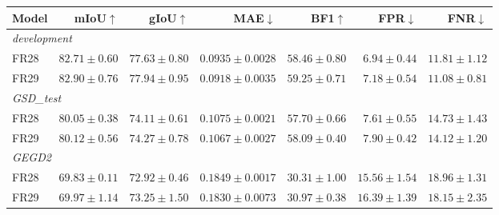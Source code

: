 \par\medskip\noindent\begin{minipage}{\linewidth}
\centering\footnotesize\setlength{\tabcolsep}{3pt}
\label{tab:seeds}
\begin{tabular}{lrrrrrr}
\toprule
Model & mIoU$\uparrow$ & gIoU$\uparrow$ & MAE$\downarrow$ & BF1$\uparrow$ & FPR$\downarrow$ & FNR$\downarrow$\\\midrule

\multicolumn{7}{l}{\textit{development}}\\
FR28 & $82.71\pm0.60$ & $77.63\pm0.80$ & $0.0935\pm0.0028$ & $58.46\pm0.80$ & $6.94\pm0.44$ & $11.81\pm1.12$\\
FR29 & $82.90\pm0.76$ & $77.94\pm0.95$ & $0.0918\pm0.0035$ & $59.25\pm0.71$ & $7.18\pm0.54$ & $11.08\pm0.81$\\
\multicolumn{7}{l}{\textit{GSD\_test}}\\
FR28 & $80.05\pm0.38$ & $74.11\pm0.61$ & $0.1075\pm0.0021$ & $57.70\pm0.66$ & $7.61\pm0.55$ & $14.73\pm1.43$\\
FR29 & $80.12\pm0.56$ & $74.27\pm0.78$ & $0.1067\pm0.0027$ & $58.09\pm0.40$ & $7.90\pm0.42$ & $14.12\pm1.20$\\
\multicolumn{7}{l}{\textit{GEGD2}}\\
FR28 & $69.83\pm0.11$ & $72.92\pm0.46$ & $0.1849\pm0.0017$ & $30.31\pm1.00$ & $15.56\pm1.54$ & $18.96\pm1.31$\\
FR29 & $69.97\pm1.14$ & $73.25\pm1.50$ & $0.1830\pm0.0073$ & $30.97\pm0.38$ & $16.39\pm1.39$ & $18.15\pm2.35$\\
\bottomrule
\end{tabular}
\end{minipage}\par\medskip
